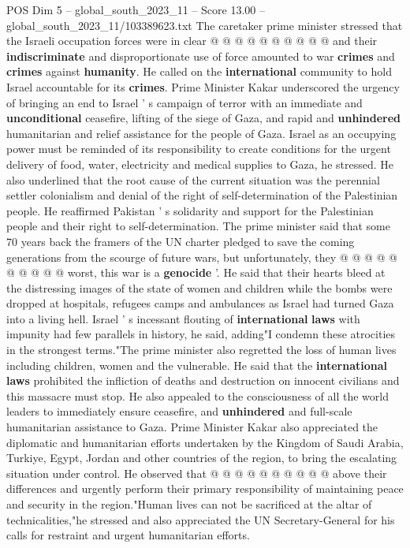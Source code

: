 \begin{textsample}{POS Dim 5 – global\_south\_2023\_11 – Score 13.00 – global\_south\_2023\_11/103389623.txt}
The caretaker prime minister stressed that the Israeli occupation forces were in clear @ @ @ @ @ @ @ @ @ @ and their \textbf{indiscriminate} and disproportionate use of force amounted to war \textbf{crimes} and \textbf{crimes} against \textbf{humanity}.
He called on the \textbf{international} community to hold Israel accountable for its \textbf{crimes}.
Prime Minister Kakar underscored the urgency of bringing an end to Israel ' s campaign of terror with an immediate and \textbf{unconditional} ceasefire, lifting of the siege of Gaza, and rapid and \textbf{unhindered} humanitarian and relief assistance for the people of Gaza.
Israel as an occupying power must be reminded of its responsibility to create conditions for the urgent delivery of food, water, electricity and medical supplies to Gaza, he stressed.
He also underlined that the root cause of the current situation was the perennial settler colonialism and denial of the right of self-determination of the Palestinian people.
He reaffirmed Pakistan ' s solidarity and support for the Palestinian people and their right to self-determination.
The prime minister said that some 70 years back the framers of the UN charter pledged to save the coming generations from the scourge of future wars, but unfortunately, they @ @ @ @ @ @ @ @ @ @ worst, this war is a \textbf{genocide} '.
He said that their hearts bleed at the distressing images of the state of women and children while the bombs were dropped at hospitals, refugees camps and ambulances as Israel had turned Gaza into a living hell.
Israel ' s incessant flouting of \textbf{international} \textbf{laws} with impunity had few parallels in history, he said, adding"I condemn these atrocities in the strongest terms."The prime minister also regretted the loss of human lives including children, women and the vulnerable.
He said that the \textbf{international} \textbf{laws} prohibited the infliction of deaths and destruction on innocent civilians and this massacre must stop.
He also appealed to the consciousness of all the world leaders to immediately ensure ceasefire, and \textbf{unhindered} and full-scale humanitarian assistance to Gaza.
Prime Minister Kakar also appreciated the diplomatic and humanitarian efforts undertaken by the Kingdom of Saudi Arabia, Turkiye, Egypt, Jordan and other countries of the region, to bring the escalating situation under control.
He observed that @ @ @ @ @ @ @ @ @ @ above their differences and urgently perform their primary responsibility of maintaining peace and security in the region."Human lives can not be sacrificed at the altar of technicalities,"he stressed and also appreciated the UN Secretary-General for his calls for restraint and urgent humanitarian efforts.

\end{textsample}
